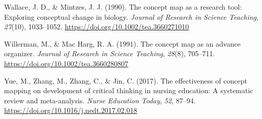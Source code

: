 \documentclass[
  letterpaper,
  DIV=11,
  numbers=noendperiod]{scrartcl}
\newlength{\cslhangindent}
\newlength{\cslentryspacingunit} %
\newenvironment{CSLReferences}[2] %
 {%
  \setlength{\parindent}{0pt}
  \ifodd #1
  \let\oldpar\par
  \def\par{\hangindent=\cslhangindent\oldpar}
  \fi
  \setlength{\parskip}{#2\cslentryspacingunit}
 }%
 {}
\begin{document}
\begin{CSLReferences}{1}{0}
\leavevmode{}%
Wallace, J. D., \& Mintzes, J. J. (1990). The concept map as a research
tool: {Exploring} conceptual change in biology. \emph{Journal of
Research in Science Teaching}, \emph{27}(10), 1033--1052.
\url{https://doi.org/10.1002/tea.3660271010}

\leavevmode{}%
Willerman, M., \& Mac Harg, R. A. (1991). The concept map as an advance
organizer. \emph{Journal of Research in Science Teaching}, \emph{28}(8),
705--711. \url{https://doi.org/10.1002/tea.3660280807}

\leavevmode{}%
Yue, M., Zhang, M., Zhang, C., \& Jin, C. (2017). The effectiveness of
concept mapping on development of critical thinking in nursing
education: {A} systematic review and meta-analysis. \emph{Nurse
Education Today}, \emph{52}, 87--94.
\url{https://doi.org/10.1016/j.nedt.2017.02.018}

\end{CSLReferences}
\end{document}
